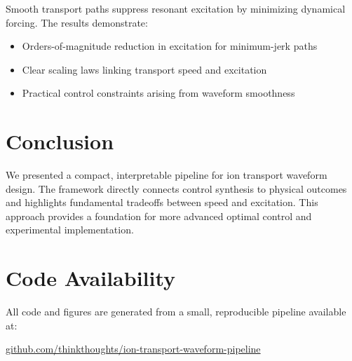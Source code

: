 \documentclass[11pt]{article}
\begin{document}
Smooth transport paths suppress resonant excitation by minimizing
dynamical forcing. The results demonstrate:

\begin{itemize}
\item Orders-of-magnitude reduction in excitation for minimum-jerk paths
\item Clear scaling laws linking transport speed and excitation
\item Practical control constraints arising from waveform smoothness
\end{itemize}

\section{Conclusion}

We presented a compact, interpretable pipeline for ion transport waveform
design. The framework directly connects control synthesis to physical
outcomes and highlights fundamental tradeoffs between speed and
excitation. This approach provides a foundation for more advanced optimal
control and experimental implementation.

\section*{Code Availability}

All code and figures are generated from a small, reproducible pipeline
available at:

\href{https://github.com/thinkthoughts/ion-transport-waveform-pipeline}
{github.com/thinkthoughts/ion-transport-waveform-pipeline}



\end{document}
